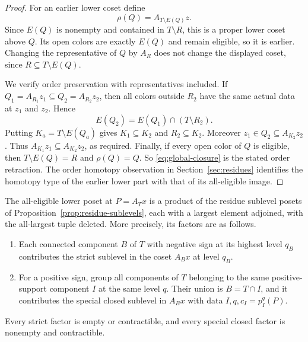 \begin{proof}
For an earlier lower coset define
\begin{equation}\label{eq:global-closure}
 \rho(Q)=A_{T\setminus E(Q)}z.
\end{equation}
Since $E(Q)$ is nonempty and contained in $T\setminus R$, this is a
proper lower coset above $Q$.  Its open colors are exactly $E(Q)$ and
remain eligible, so it is earlier.  Changing the representative of
$Q$ by $A_R$ does not change the displayed coset, since
$R\subseteq T\setminus E(Q)$.

We verify order preservation with representatives included.  If
$Q_1=A_{R_1}z_1\subseteq Q_2=A_{R_2}z_2$, then all colors outside
$R_2$ have the same actual data at $z_1$ and $z_2$.  Hence
\[
 E(Q_2)=E(Q_1)\cap(T\setminus R_2).
\]
Putting $K_a=T\setminus E(Q_a)$ gives $K_1\subseteq K_2$ and
$R_2\subseteq K_2$.  Moreover
$z_1\in Q_2\subseteq A_{K_2}z_2$.  Thus
$A_{K_1}z_1\subseteq A_{K_2}z_2$, as required.  Finally, if every open
color of $Q$ is eligible, then $T\setminus E(Q)=R$ and $\rho(Q)=Q$.
So \eqref{eq:global-closure} is the stated order retraction.
The order homotopy observation in Section~\ref{sec:residues}
identifies the homotopy type of the earlier lower part with that of
its all-eligible image.
\end{proof}

\begin{lemma}\label{lem:global-residue-blocks}
The all-eligible lower poset at $P=A_Tx$ is a product of the residue
sublevel posets of Proposition~\ref{prop:residue-sublevels}, each with a
largest element adjoined, with the all-largest tuple deleted.  More
precisely, its factors are as follows.
\begin{enumerate}
 \item Each connected component $B$ of $T$ with negative sign at its
 highest level $q_B$ contributes the strict sublevel in the coset
 $A_Bx$ at level $q_B$.
 \item For a positive sign, group all components of $T$ belonging to the
 same positive-support component $I$ at the same level $q$.  Their union
 is $B=T\cap I$, and it contributes the special closed sublevel in
 $A_Bx$ with data $I,q,c_I=p_I^q(P)$.
\end{enumerate}
Every strict factor is empty or contractible, and every special closed
factor is nonempty and contractible.
\end{lemma}

